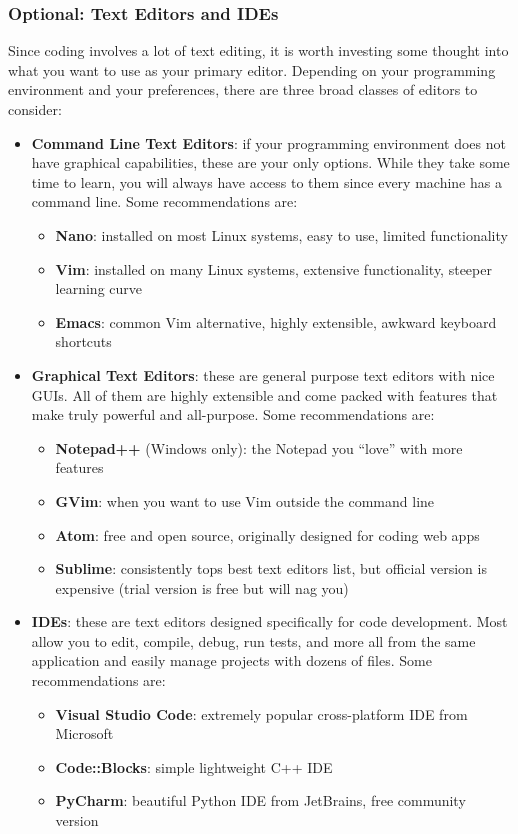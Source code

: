 \documentclass[12pt]{article}
\begin{document}
\subsubsection{Optional: Text Editors and IDEs}
Since coding involves a lot of text editing, it is worth investing some thought into what you want to use as your primary editor. Depending on your programming environment and your preferences, there are three broad classes of editors to consider:
\begin{itemize}
    \item \textbf{Command Line Text Editors}: if your programming environment does not have graphical capabilities, these are your only options.
        While they take some time to learn, you will always have access to them since every machine has a command line.
        Some recommendations are:
        \begin{itemize}
            \item \textbf{Nano}: installed on most Linux systems, easy to use, limited functionality
            \item \textbf{Vim}: installed on many Linux systems, extensive functionality, steeper learning curve
            \item \textbf{Emacs}: common Vim alternative, highly extensible, awkward keyboard shortcuts
        \end{itemize}
    \item \textbf{Graphical Text Editors}: these are general purpose text editors with nice GUIs.
        All of them are highly extensible and come packed with features that make truly powerful and all-purpose.
        Some recommendations are:
        \begin{itemize}
            \item \textbf{Notepad++} (Windows only): the Notepad you ``love'' with more features
            \item \textbf{GVim}: when you want to use Vim outside the command line
            \item \textbf{Atom}: free and open source, originally designed for coding web apps
            \item \textbf{Sublime}: consistently tops best text editors list, but official version is expensive (trial version is free but will nag you)
        \end{itemize}
    \item \textbf{IDEs}: these are text editors designed specifically for code development.
        Most allow you to edit, compile, debug, run tests, and more all from the same application and easily manage projects with dozens of files.
        Some recommendations are:
        \begin{itemize}
            \item \textbf{Visual Studio Code}: extremely popular cross-platform IDE from Microsoft
            \item \textbf{Code::Blocks}: simple lightweight C++ IDE
            \item \textbf{PyCharm}: beautiful Python IDE from JetBrains, free community version
        \end{itemize}
\end{itemize}
\end{document}
